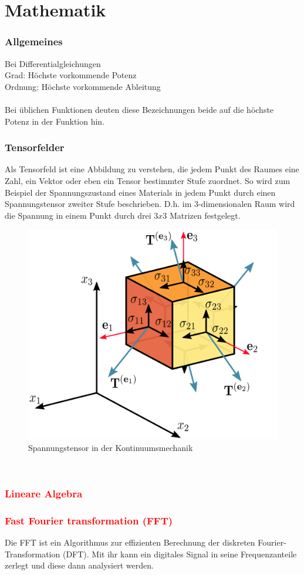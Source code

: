 \part{Mathematik}
\section{Allgemeines}
	Bei Differentialgleichungen\\
	Grad: Höchste vorkommende Potenz\\
	Ordnung: Höchste vorkommende Ableitung\\\\
	Bei üblichen Funktionen deuten diese Bezeichnungen beide auf die höchste Potenz in der Funktion hin.
	
\section{Tensorfelder}
	Als Tensorfeld ist eine Abbildung zu verstehen, die jedem Punkt des Raumes eine Zahl, ein Vektor oder eben ein Tensor bestimmter Stufe zuordnet. So wird zum Beispiel der Spannungszustand eines Materials in jedem Punkt durch einen Spannungstensor zweiter Stufe beschrieben. D.h. im 3-dimensionalen Raum wird die Spannung in einem Punkt durch drei $ 3x3 $ Matrizen festgelegt.
	\begin{figure}[h]
		\centering
		\includegraphics[width=0.4\linewidth]{./pics/ma/spannungstensor}
		\caption{Spannungstensor in der Kontinuumsmechanik}
	\end{figure}
	\leavevmode\\
	
\section{\textcolor{red}{Lineare Algebra}}
\section{\textcolor{red}{Fast Fourier transformation (FFT)}}
	Die FFT ist ein Algorithmus zur effizienten Berechnung der diskreten Fourier-Transformation (DFT). Mit ihr kann ein digitales Signal in seine Frequenzanteile zerlegt und diese dann analysiert werden.
